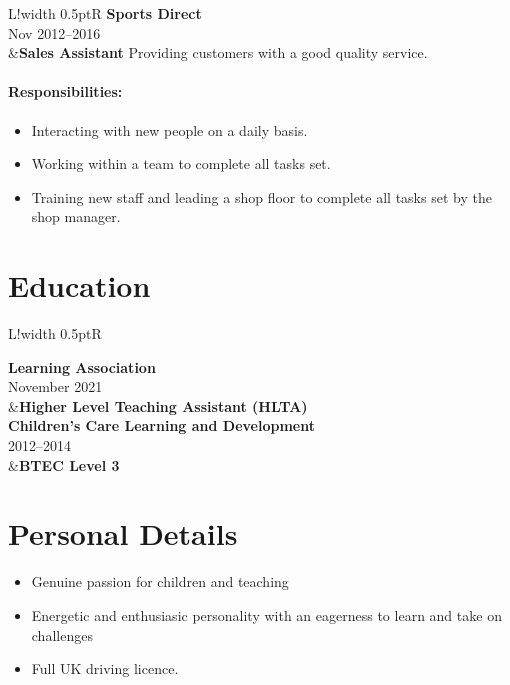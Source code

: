 \documentclass[10pt]{article}
\newcommand\VRule{\color{lightgray}\vrule width 0.5pt}
\begin{document}
\begin{longtable}{L!{\VRule}R}
{\bf Sports Direct}\\
Nov 2012--2016\\
&{\bf Sales Assistant}\newline
Providing customers with a good quality service.

\vspace{-3mm}
\paragraph{Responsibilities:}
\begin{itemize}[noitemsep,topsep=0pt]
    \item Interacting with new people on a daily basis.
    \item Working within a team to complete all tasks set.
    \item Training new staff and leading a shop floor to complete all tasks set by the shop manager.
\end{itemize}
\end{longtable}

\section*{Education}

\begin{longtable}{L!{\VRule}R}

{\bf Learning Association}\\
November 2021\\
    &{\bf Higher Level Teaching Assistant (HLTA)}\newline
\\

{\bf Children's Care Learning and Development}\\
2012--2014\\
    &{\bf BTEC Level 3}\newline
\\

\end{longtable}

\section*{Personal Details}
\begin{itemize}[noitemsep,topsep=0pt]
    \item Genuine passion for children and teaching
    \item Energetic and enthusiasic personality with an eagerness to learn and take on challenges
	\item Full UK driving licence.
\end{itemize}
\end{document}
